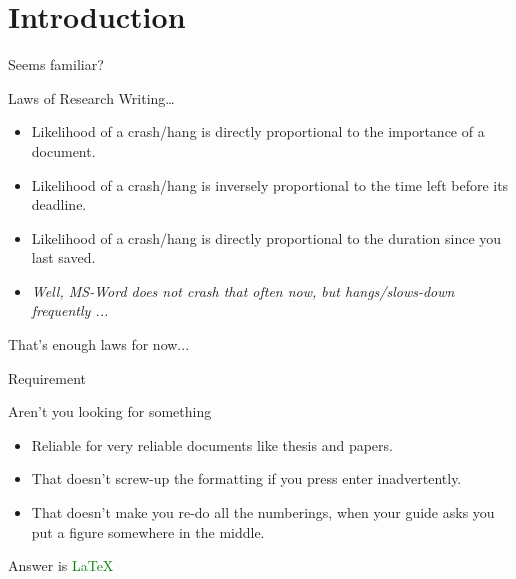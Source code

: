 \section{Introduction}


\begin{frame}{Seems familiar?}

\begin{block}{Laws of Research Writing\ldots}
\begin{itemize}%
\item  Likelihood of a crash/hang is directly proportional to the importance of a document.
\item  Likelihood of a crash/hang is inversely proportional to the time left before its deadline.
\item  Likelihood of a crash/hang is directly proportional to the duration since you last saved.
\item \textit{Well, MS-Word does not crash that often now, but hangs/slows-down frequently ...}
\end{itemize}
\end{block}

\vspace{5mm}
That's enough laws for now...
\vspace{5mm}
\end{frame}


\begin{frame}{Requirement}
\begin{block}{Aren't you looking for something}
\begin{itemize}%
\item  Reliable for very reliable documents like thesis and papers.
\item  That doesn't screw-up the formatting if you press enter inadvertently.
\item  That doesn't make you re-do all the numberings, when your guide asks you put a figure somewhere in the middle.
\end{itemize}
\end{block}

\vspace{5mm}
Answer is \textcolor{green}{\LaTeX}
\end{frame}

